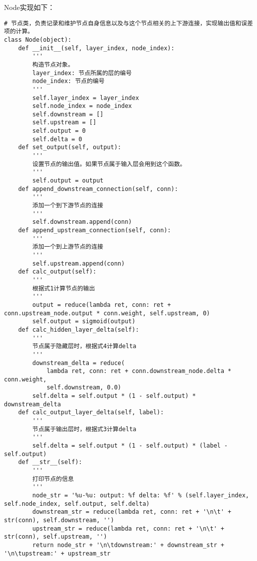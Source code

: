 Node实现如下：
\begin{lstlisting}
# 节点类，负责记录和维护节点自身信息以及与这个节点相关的上下游连接，实现输出值和误差项的计算。
class Node(object):
    def __init__(self, layer_index, node_index):
        '''
        构造节点对象。
        layer_index: 节点所属的层的编号
        node_index: 节点的编号
        '''
        self.layer_index = layer_index
        self.node_index = node_index
        self.downstream = []
        self.upstream = []
        self.output = 0
        self.delta = 0
    def set_output(self, output):
        '''
        设置节点的输出值。如果节点属于输入层会用到这个函数。
        '''
        self.output = output
    def append_downstream_connection(self, conn):
        '''
        添加一个到下游节点的连接
        '''
        self.downstream.append(conn)
    def append_upstream_connection(self, conn):
        '''
        添加一个到上游节点的连接
        '''
        self.upstream.append(conn)
    def calc_output(self):
        '''
        根据式1计算节点的输出
        '''
        output = reduce(lambda ret, conn: ret + conn.upstream_node.output * conn.weight, self.upstream, 0)
        self.output = sigmoid(output)
    def calc_hidden_layer_delta(self):
        '''
        节点属于隐藏层时，根据式4计算delta
        '''
        downstream_delta = reduce(
            lambda ret, conn: ret + conn.downstream_node.delta * conn.weight,
            self.downstream, 0.0)
        self.delta = self.output * (1 - self.output) * downstream_delta
    def calc_output_layer_delta(self, label):
        '''
        节点属于输出层时，根据式3计算delta
        '''
        self.delta = self.output * (1 - self.output) * (label - self.output)
    def __str__(self):
        '''
        打印节点的信息
        '''
        node_str = '%u-%u: output: %f delta: %f' % (self.layer_index, self.node_index, self.output, self.delta)
        downstream_str = reduce(lambda ret, conn: ret + '\n\t' + str(conn), self.downstream, '')
        upstream_str = reduce(lambda ret, conn: ret + '\n\t' + str(conn), self.upstream, '')
        return node_str + '\n\tdownstream:' + downstream_str + '\n\tupstream:' + upstream_str 
\end{lstlisting}

